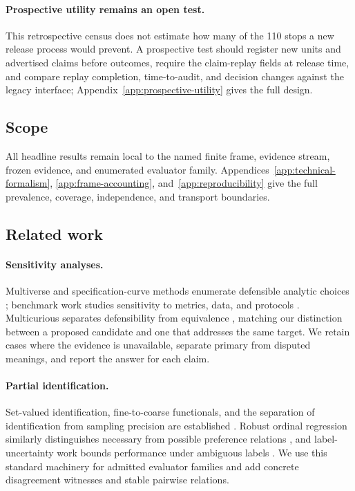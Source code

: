 \documentclass{article}
\begin{document}
\paragraph{Prospective utility remains an open test.}
This retrospective census does not estimate how many of the 110 stops a new release process would prevent.  A prospective test should register new units and advertised claims before outcomes, require the claim-replay fields at release time, and compare replay completion, time-to-audit, and decision changes against the legacy interface; Appendix~\ref{app:prospective-utility} gives the full design.

\subsection{Scope}

All headline results remain local to the named finite frame, evidence stream, frozen evidence, and enumerated evaluator family.  Appendices~\ref{app:technical-formalism}, \ref{app:frame-accounting}, and~\ref{app:reproducibility} give the full prevalence, coverage, independence, and transport boundaries.

\subsection{Related work}

\paragraph{Sensitivity analyses.}
Multiverse and specification-curve methods enumerate defensible analytic choices \citep{Steegen2016Multiverse,Simonsohn2020SpecificationCurve,Silberzahn2018ManyAnalysts}; benchmark work studies sensitivity to metrics, data, and protocols \citep{Flach2019PerformanceEvaluation,Bouthillier2021Variance,Dehghani2021BenchmarkLottery,DAmour2022Underspecification}.  Multicurious separates defensibility from equivalence \citep{ShortEtAl2026Multicurious}, matching our distinction between a proposed candidate and one that addresses the same target.  We retain cases where the evidence is unavailable, separate primary from disputed meanings, and report the answer for each claim.

\paragraph{Partial identification.}
Set-valued identification, fine-to-coarse functionals, and the separation of identification from sampling precision are established \citep{Tamer2010PartialIdentification,RomanoShaikh2008IdentifiableParameters,Kasy2016WelfareRanking}.  Robust ordinal regression similarly distinguishes necessary from possible preference relations \citep{GrecoEtAl2008OrdinalRegression}, and label-uncertainty work bounds performance under ambiguous labels \citep{PoloEtAl2024WeakSupervisionPI}.  We use this standard machinery for admitted evaluator families and add concrete disagreement witnesses and stable pairwise relations.
\end{document}
